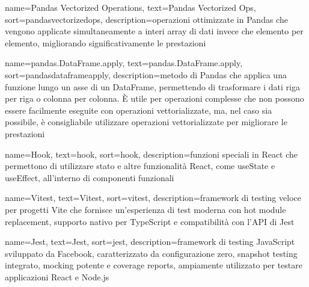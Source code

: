  {
    name=Pandas Vectorized Operations,
    text=Pandas Vectorized Ops,
    sort=pandasvectorizedops,
    description={operazioni ottimizzate in Pandas che vengono applicate simultaneamente a interi array di dati invece che elemento per elemento, migliorando significativamente le prestazioni}
}

 {
    name=pandas.DataFrame.apply,
    text=pandas.DataFrame.apply,
    sort=pandasdataframeapply,
    description={metodo di Pandas che applica una funzione lungo un asse di un DataFrame, permettendo di trasformare i dati riga per riga o colonna per colonna. È utile per operazioni complesse che non possono essere facilmente eseguite con operazioni vettorializzate, ma, nel caso sia possibile, è consigliabile utilizzare operazioni vettorializzate per migliorare le prestazioni}
}

 {
    name=Hook,
    text=hook,
    sort=hook,
    description={funzioni speciali in React che permettono di utilizzare stato e altre funzionalità React, come useState e useEffect, all'interno di componenti funzionali}
}

 {
    name=Vitest,
    text=Vitest,
    sort=vitest,
    description={framework di testing veloce per progetti Vite che fornisce un'esperienza di test moderna con hot module replacement, supporto nativo per TypeScript e compatibilità con l'API di Jest}
}

 {
    name=Jest,
    text=Jest,
    sort=jest,
    description={framework di testing JavaScript sviluppato da Facebook, caratterizzato da configurazione zero, snapshot testing integrato, mocking potente e coverage reports, ampiamente utilizzato per testare applicazioni React e Node.js}
}
